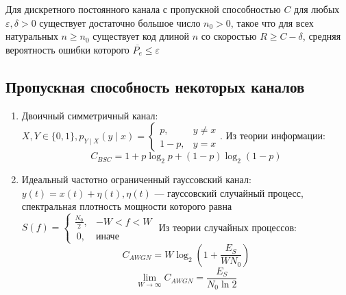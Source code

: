 \begin{theorem}[прямая]
    Для дискретного постоянного канала с пропускной способностью \(C\) для любых \(\varepsilon, \delta > 0\) существует достаточно большое число \(n_0 > 0\), такое что для всех натуральных \(n \ge n_0\) существует код длиной \(n\) со скоростью \(R \ge C - \delta\), средняя вероятность ошибки которого \(\overline{P_e} \le \varepsilon\)
\end{theorem}

\subsection{Пропускная способность некоторых каналов}

\begin{enumerate}
    \item Двоичный симметричный канал: \(X, Y \in \{0, 1\}, p_{Y \mid X}(y \mid x) = \begin{cases}
              p,      & y \neq x \\
              1 - p , & y = x
          \end{cases}\). Из теории информации:
          \[C_{BSC} = 1 + p \log_2 p + (1 - p) \log_2(1 - p)\]
    \item Идеальный частотно ограниченный гауссовский канал: \(y(t) = x(t) + \eta(t), \eta(t)\) --- гауссовский случайный процесс, спектральная плотность мощности которого равна \(S(f) = \begin{cases}
              \frac{N_0}{2}, & -W < f < W   \\\
              0,             & \text{иначе}
          \end{cases}\)
          Из теории случайных процессов:
          \[C_{AWGN} = W \log_2 \left(1 + \frac{E_S}{WN_0}\right)\]
          \[\lim_{W \to \infty} C_{AWGN} = \frac{E_S}{N_0 \ln 2}\]
\end{enumerate}
